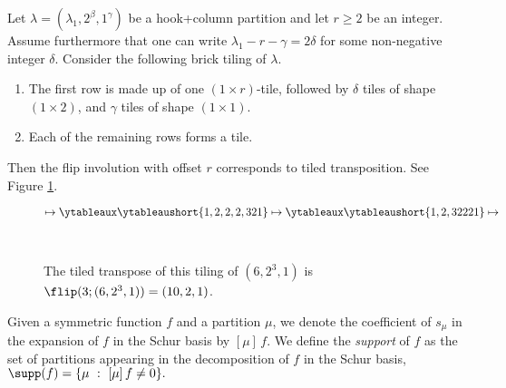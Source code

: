 \documentclass[twoside]{article}
\begin{document}
\begin{lem}\label{flip_combinatorially}
Let $\lambda = (\lambda_1, 2^{\beta}, 1^{\gamma})$ be a hook+column partition and let $r\ge2$ be an integer. Assume furthermore that one can write $\lambda_1 - r - \gamma = 2\delta$ for some non-negative integer $\delta$.
Consider the following brick tiling of $\lambda$.
    \begin{enumerate}
        \item The first row is made up of one  $(1\times r)$-tile, followed by $\delta$ tiles of shape $(1\times 2)$, and $\gamma$ tiles of shape $(1\times 1)$.
        \item Each of the remaining rows forms a tile.
    \end{enumerate} 
Then the flip involution with offset $r$ corresponds to tiled transposition. See Figure \ref{fig:r-flip pos}.
\end{lem}

\begin{figure}[H]
    \centering
    $\mapsto
    \ytableaux \ytableaushort{1,2,2,2,321} \mapsto
    \ytableaux \ytableaushort{1,2,32221} \mapsto$
    \\
    \caption{The tiled transpose of this tiling of $(6,2^3,1)$ is
    $\flip(3;(6,2^3,1))=(10, 2,1)$.}
    \label{fig:r-flip pos}
\end{figure}


Given a symmetric function $f$ and a partition $\mu$, we denote  the coefficient of $s_\mu$ in the expansion of $f$ in the Schur basis by $[\mu]\,f$. We define the \emph{support} of $f$ as the set of partitions appearing in the decomposition of $f$ in the Schur basis, $\supp(f)=\{\mu \ : \ [\mu]
\, f\ne0\}.$
\end{document}
